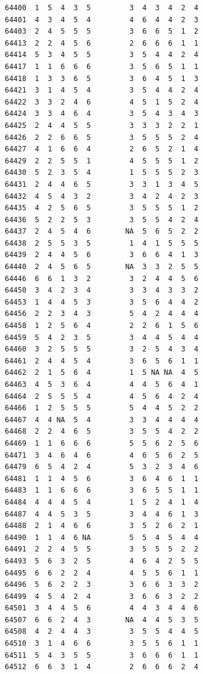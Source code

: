 \documentclass[
  letterpaper,
  DIV=11,
  numbers=noendperiod]{scrreprt}
\begin{document}
\begin{verbatim}
64400  1  5  4  3  5         3  4  3  4  2  4
64401  4  3  4  5  4         4  6  4  4  2  3
64403  2  4  5  5  5         3  6  6  5  1  2
64413  2  2  4  5  6         2  6  6  6  1  1
64414  5  3  4  5  5         3  5  4  4  2  4
64417  1  1  6  6  6         3  5  6  5  1  1
64418  1  3  3  6  5         3  6  4  5  1  3
64421  3  1  4  5  4         3  5  4  4  2  4
64422  3  3  2  4  6         4  5  1  5  2  4
64424  3  3  4  6  4         3  5  4  3  4  3
64425  2  4  4  5  5         3  3  3  2  2  1
64426  2  2  6  6  5         3  5  5  5  2  4
64427  4  1  6  6  4         2  6  5  2  1  4
64429  2  2  5  5  1         4  5  5  5  1  2
64430  5  2  3  5  4         1  5  5  5  2  3
64431  2  4  4  6  5         3  3  1  3  4  5
64432  4  5  4  3  2         3  4  2  4  2  3
64435  4  2  5  6  5         3  5  5  5  1  2
64436  5  2  2  5  3         3  5  5  4  2  4
64437  2  4  5  4  6        NA  5  6  5  2  2
64438  2  5  5  3  5         1  4  1  5  5  5
64439  2  4  4  5  6         3  6  6  4  1  3
64440  2  4  5  6  5        NA  3  3  2  5  5
64446  6  6  1  3  2         3  2  4  4  5  6
64450  3  4  2  3  4         3  3  4  3  3  2
64453  1  4  4  5  3         3  5  6  4  4  2
64456  2  2  3  4  3         5  4  2  4  4  4
64458  1  2  5  6  4         2  2  6  1  5  6
64459  5  4  2  3  5         3  4  4  5  4  4
64460  3  2  5  5  5         3  2  5  4  3  4
64461  2  4  4  5  4         3  6  5  6  1  1
64462  2  1  5  6  4         1  5 NA NA  4  5
64463  4  5  3  6  4         4  4  5  6  4  1
64464  2  5  5  5  4         4  5  6  4  2  4
64466  1  2  5  5  5         5  4  4  5  2  2
64467  4  4 NA  5  4         3  3  4  4  4  4
64468  2  2  4  6  5         3  5  5  4  2  2
64469  1  1  6  6  6         5  5  6  2  5  6
64471  3  4  6  4  6         4  6  5  6  2  5
64479  6  5  4  2  4         5  3  2  3  4  6
64481  1  1  4  5  6         3  6  4  6  1  1
64483  1  1  6  6  6         3  6  5  5  1  1
64484  4  4  4  5  4         1  5  2  4  1  4
64487  4  4  5  3  5         3  4  4  6  1  3
64488  2  1  4  6  6         3  5  2  6  2  1
64490  1  1  4  6 NA         5  5  4  5  4  4
64491  2  2  4  5  5         3  5  5  5  2  2
64493  5  6  3  2  5         4  6  4  2  5  5
64495  6  6  2  2  4         4  5  5  6  1  1
64496  5  6  2  2  3         3  6  6  3  3  2
64499  4  5  4  2  4         3  6  6  3  2  2
64501  3  4  4  5  6         4  4  3  4  4  6
64507  6  6  2  4  3        NA  4  4  5  3  5
64508  4  2  4  4  3         3  5  5  4  4  5
64510  3  1  4  6  6         3  5  5  6  1  1
64511  5  4  3  5  5         3  6  6  6  1  1
64512  6  6  3  1  4         2  6  6  6  2  4

\end{verbatim}
\end{document}
